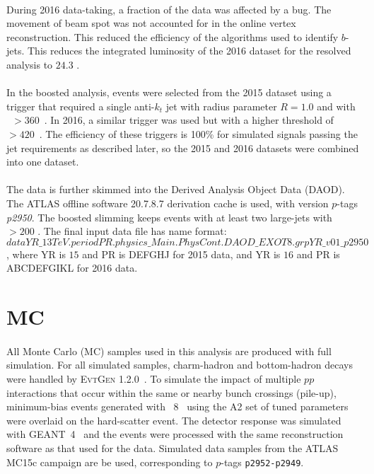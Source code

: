 \paragraph{}
During 2016 data-taking, a fraction of the data was affected by a bug.
The movement of beam spot was not accounted for in the online vertex reconstruction.
This reduced the efficiency of the algorithms used to identify $b$-jets. 
This reduces the integrated luminosity of the 2016 dataset for the resolved analysis to $24.3$ \ifb.

\paragraph{}
In the boosted analysis, events were selected from the 2015 dataset using a trigger that required a single anti-$k_t$ jet with radius parameter $R=1.0$ and with \pt~$>360$~\GeV. In 2016, a similar trigger was used but with a higher threshold of \pt~$>420$~\GeV. The efficiency of these triggers is 100\% for simulated signals passing the jet requirements as described later, so the 2015 and 2016 datasets were combined into one dataset. 

\paragraph{}
The data is further skimmed into the Derived Analysis Object Data (DAOD). The ATLAS offline software 20.7.8.7 derivation cache is used, with version $p$-tags \textit{p2950}. The boosted slimming keeps events with at least two large-\R jets with \pt~$>200$ \GeV. The final input data file has name format: $dataYR\_13TeV.periodPR.physics\_Main.PhysCont.DAOD\_EXOT8.grpYR\_v01\_p2950$, where YR is $15$ and PR is DEFGHJ for 2015 data, and YR is $16$ and PR is ABCDEFGIKL for 2016 data.


\section{MC}
\paragraph{}
All Monte Carlo (MC) samples used in this analysis are produced with full simulation.
For all simulated samples, charm-hadron and bottom-hadron decays were handled by {\textsc{EvtGen}} 1.2.0~\cite{EvtGen}. 
To simulate the impact of multiple $pp$ interactions that occur within the same or nearby bunch crossings (pile-up), minimum-bias events generated with \pythia~8~\cite{Sjostrand:2006za} using the A2 set of tuned parameters~\cite{MC12AU2} were overlaid on the hard-scatter event. 
The detector response was simulated with GEANT~4~\cite{Agostinelli:2002hh, Aad:2010ah} and the events were processed with the same reconstruction software as that used for the data.  
Simulated data samples from the ATLAS MC15c campaign are be used, corresponding to $p$-tags \texttt{p2952-p2949}.

